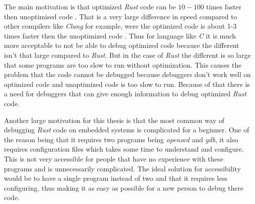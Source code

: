 


The main motivation is that optimized \emph{Rust} code can be $10-100$ times faster then unoptimised code \cite{perf-book}.
That is a very large difference in speed compared to other compilers like \emph{Clang} for example, were the optimized code is about 1-3 times faster then the unoptimized code \cite{clang-opt}.
Thus for language like \emph{C} it is much more acceptable to not be able to debug optimized code because the different isn't that large compared to \emph{Rust}.
But in the case of \emph{Rust} the different is so large that some programs are too slow to run without optimization.
This causes the problem that the code cannot be debugged because debuggers don't work well on optimized code and unoptimized code is too slow to run.
Because of that there is a need for debuggers that can give enough information to debug optimized \emph{Rust} code.


Another large motivation for this thesis is that the most common way of debugging \emph{Rust} code on embedded systems is complicated for a beginner.
One of the reason being that it requires two programs being \emph{openocd} and \emph{gdb}, it also requires configuration files which takes some time to understand and configure.
This is not very accessible for people that have no experience with these programs and is unnecessarily complicated.
The ideal solution for accessibility would be to have a single program instead of two and that it requires less configuring, thus making it as easy as possible for a new person to debug there code.



